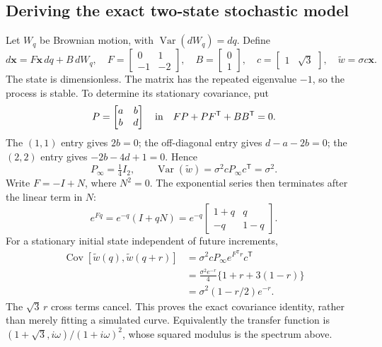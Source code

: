 \subsection{Deriving the exact two-state stochastic model}
Let $W_q$ be Brownian motion, with $\operatorname{Var}(dW_q)=dq$. Define
\begin{equation}
 d\mathbf x=F\mathbf x\,dq+B\,dW_q,
 \quad F=\begin{bmatrix}0&1\\-1&-2\end{bmatrix},
 \quad B=\begin{bmatrix}0\\1\end{bmatrix},
 \quad c=\begin{bmatrix}1&\sqrt3\end{bmatrix},
 \quad \widetilde w=\sigma c\mathbf x.
\end{equation}
The state is dimensionless. The matrix has the repeated eigenvalue $-1$, so the process is stable. To determine its stationary covariance, put
\begin{equation}
 P=\begin{bmatrix}a&b\\b&d\end{bmatrix}
 \quad\hbox{in}\quad FP+PF^{\mathsf T}+BB^{\mathsf T}=0.
\end{equation}
The $(1,1)$ entry gives $2b=0$; the off-diagonal entry gives $d-a-2b=0$; the $(2,2)$ entry gives $-2b-4d+1=0$. Hence
\begin{equation}
 \boxed{P_\infty=\tfrac14 I_2,\qquad \operatorname{Var}(\widetilde w)=\sigma^2 cP_\infty c^{\mathsf T}=\sigma^2.}
\end{equation}
Write $F=-I+N$, where $N^2=0$. The exponential series then terminates after the linear term in $N$:
\begin{equation}
 e^{Fq}=e^{-q}(I+qN)
 =e^{-q}\begin{bmatrix}1+q&q\\-q&1-q\end{bmatrix}.
\end{equation}
For a stationary initial state independent of future increments,
\begin{align}
 \operatorname{Cov}[\widetilde w(q),\widetilde w(q+r)]
 &=\sigma^2 cP_\infty e^{F^{\mathsf T}r}c^{\mathsf T}\\
 &=\frac{\sigma^2 e^{-r}}4\{1+r+3(1-r)\}\\
 &=\boxed{\sigma^2(1-r/2)e^{-r}}.
\end{align}
The $\sqrt3\,r$ cross terms cancel. This proves the exact covariance identity, rather than merely fitting a simulated curve. Equivalently the transfer function is $(1+\sqrt3,i\omega)/(1+i\omega)^2$, whose squared modulus is the spectrum above.

